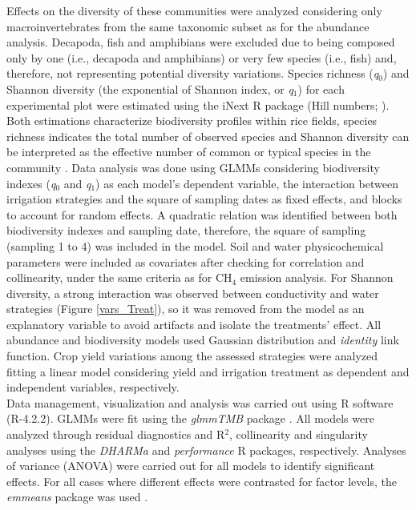 Effects on the diversity of these communities were analyzed considering only macroinvertebrates from the same taxonomic subset as for the abundance analysis. Decapoda, fish and amphibians were excluded due to being composed only by one (i.e., decapoda and amphibians) or very few species (i.e., fish) and, therefore, not representing potential diversity variations. Species richness (\textit{q$_{0}$}) and Shannon diversity (the exponential of  Shannon index, or \textit{q$_{1}$}) for each experimental plot were estimated using the iNext R package (Hill numbers; \cite{chao2014a, hsieh2016}). Both estimations characterize biodiversity profiles within rice fields, species richness indicates the total number of observed species and Shannon diversity can be interpreted as the effective number of common or typical species in the community \citep{chao2014}. Data analysis was done using GLMMs considering biodiversity indexes (\textit{q$_{0}$} and \textit{q$_{1}$}) as each model's dependent variable, the interaction between irrigation strategies and the square of sampling dates as fixed effects, and blocks to account for random effects. A quadratic relation was identified between both biodiversity indexes and sampling date, therefore, the square of sampling (sampling 1 to 4) was included in the model. Soil and water physicochemical parameters were included as covariates after checking for correlation and collinearity, under the same criteria as for CH$_{4}$ emission analysis. For Shannon diversity, a strong interaction was observed between conductivity and water strategies (Figure \ref{vars_Treat}), so it was removed from the model as an explanatory variable to avoid artifacts and isolate the treatments' effect. All abundance and biodiversity models used Gaussian distribution and \textit{identity} link function. Crop yield variations among the assessed strategies were analyzed fitting a linear model considering yield and irrigation treatment as dependent and independent variables, respectively.\\

Data management, visualization and analysis was carried out using R software (R-4.2.2). GLMMs were fit using the \textit{glmmTMB} package \citep{brooks2017}. All models were analyzed through residual diagnostics and R$^{2}$, collinearity and singularity analyses using the \textit{DHARMa} \citep{dharm2020residual} and \textit{performance} \citep{ludecke2021} R packages, respectively. Analyses of variance (ANOVA) were carried out for all models to identify significant effects. For all cases where different effects were contrasted for factor levels, the \textit{emmeans} package was used \citep{lenth2017}.  

